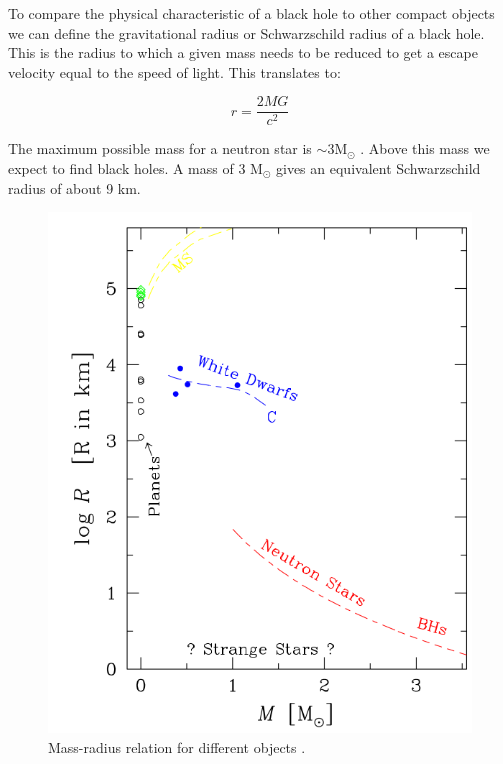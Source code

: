 To compare the physical characteristic of a black hole to other compact objects we can define the gravitational radius or Schwarzschild radius of a black hole. This is the radius to which a given mass needs to be reduced to get a escape velocity equal to the speed of light. This translates to:

%

\begin{equation}
                r = \frac{2 M G}{c^2}
\end{equation}

The maximum possible mass for a neutron star is $\sim 3 \text{M}_\odot$ \citep{rhoades_maximum_1974}. Above this mass we expect to find black holes. A mass of 3 M$_\odot$ gives an equivalent Schwarzschild radius of about 9 km. 


\begin{figure}
                \centering
                \includegraphics[scale=0.3]{assets/images/mass-radius.png}
                \caption{Mass-radius relation for different objects \citep{de2008stars}.}
                \label{fig:massrad}
\end{figure}


